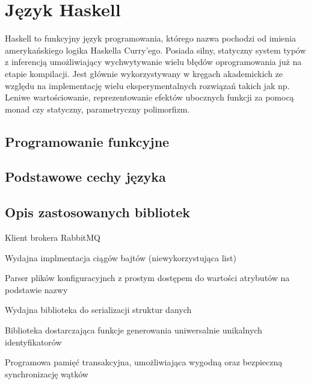 \chapter{Język Haskell}
\label{cha:haskell}
Haskell to funkcyjny język programowania, którego nazwa pochodzi od imienia amerykańskiego logika Haskella Curry'ego. Posiada silny, statyczny system typów z inferencją umożliwiający wychwytywanie wielu błędów oprogramowania już na etapie kompilacji. Jest głównie wykorzystywany w kręgach akademickich ze względu na implementację wielu eksperymentalnych rozwiązań takich jak np. Leniwe wartościowanie, reprezentowanie efektów ubocznych funkcji za pomocą monad czy statyczny, parametryczny polimorfizm. 

\section{Programowanie funkcyjne}
\label{sec:architektura}

\section{Podstawowe cechy języka}
\label{sec:cechyjezyka}

\section{Opis zastosowanych bibliotek}
\label{sec:cechyjezyka}
\begin{description}[align=left]
  \item [amqp] Klient brokera RabbitMQ
  \item [bytestring] Wydajna implmentacja ciągów bajtów (niewykorzystująca list)
  \item [configurator] Parser plików konfiguracyjnch z prostym dostępem do wartości atrybutów na podstawie nazwy
  \item [store] Wydajna biblioteka do serializacji struktur danych
  \item [uuid] Biblioteka dostarczająca funkcje generowania uniwersalnie unikalnych identyfikatorów
  \item [stm] Programowa pamięć transakcyjna, umożliwiająca wygodną oraz bezpieczną synchronizację wątków
\end{description}